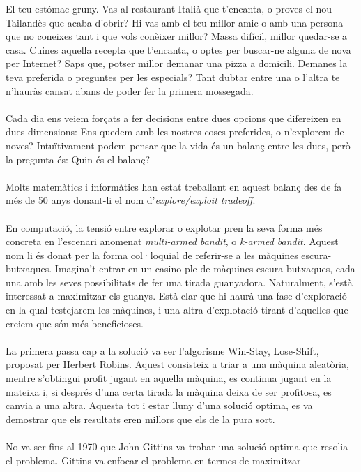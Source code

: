 
El teu estómac gruny. Vas al restaurant Italià que t'encanta,
o proves el nou Tailandès que acaba d'obrir? Hi vas amb el
teu millor amic o amb una persona que no coneixes tant i que
vols conèixer millor? Massa difícil, millor quedar-se a casa.
Cuines aquella recepta que t'encanta, o optes per buscar-ne
alguna de nova per Internet? Saps que, potser millor demanar
una pizza a domicili. Demanes la teva preferida o preguntes
per les especials? Tant dubtar entre una o l'altra te n'hauràs
cansat abans de poder fer la primera mossegada.
\\\\
Cada dia ens veiem forçats a fer decisions entre dues opcions
que difereixen en dues dimensions: Ens quedem amb les nostres
coses preferides, o n'explorem de noves? Intuïtivament podem
pensar que la vida és un balanç entre les dues, però la pregunta
és: Quin és el balanç?
\\\\
Molts matemàtics i informàtics han estat treballant en aquest
balanç des de fa més de 50 anys donant-li el nom d'\textit{explore/exploit
tradeoff}.
\\\\
En computació, la tensió entre explorar o explotar pren la seva
forma més concreta en l'escenari anomenat \textit{multi-armed bandit}, o
\textit{k-armed bandit}. Aquest nom li és donat per la forma
col·loquial de referir-se a les màquines escura-butxaques.
Imagina't entrar en un casino ple de màquines escura-butxaques,
cada una amb les seves possibilitats de fer una tirada guanyadora.
Naturalment, s'està interessat a maximitzar els guanys. Està clar
que hi haurà una fase d'exploració en la qual testejarem les màquines,
i una altra d'explotació tirant d'aquelles que creiem que són més
beneficioses.\\
\\
La primera passa cap a la solució va ser l'algorisme Win-Stay, Lose-Shift,
proposat per Herbert Robins. Aquest consisteix a triar a una màquina
aleatòria, mentre s'obtingui profit jugant en aquella màquina, es continua
jugant en la mateixa i, si després d'una certa tirada la màquina deixa de ser
profitosa, es canvia a una altra. Aquesta tot i estar lluny d'una solució optima,
es va demostrar que els resultats eren millors que els de la pura sort.\\
\\
No va ser fins al 1970 que John Gittins va trobar una solució optima que
resolia el problema. Gittins va enfocar el problema en termes de maximitzar

